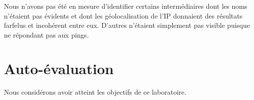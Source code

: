 \documentclass[11pt,a4paper]{article}
\begin{document}
Nous n'avons pas été en mesure d'identifier certains intermédiaires dont les noms n'étaient pas évidents et dont les géolocalisation de l'IP donnaient des résultats farfelus et incohérent entre eux. D'autres n'étaient simplement pas visible puisque ne répondant pas aux pings.

\section*{Auto-évaluation}

Nous considérons avoir atteint les objectifs de ce laboratoire.
\end{document}
